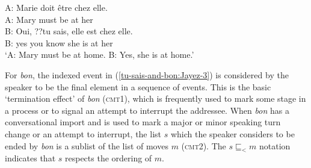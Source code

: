 \documentclass[output=paper,colorlinks,citecolor=brown]{langscibook}
\begin{document}
\ea \label{tu-sais:Jayez}
\gll A: Marie doit être chez elle.\\
A: Mary must be at her\\
\gll B: Oui, ??tu sais, elle est chez elle.\\
B: yes you know she is at her\\
\glt `A: Mary must be at home. B: Yes, she is at home.'
\z

For \textit{bon}, the indexed event in (\ref{tu-sais-and-bon:Jayez-3}) is considered by the speaker to be the final element in a sequence of events. This is the basic `termination effect' of \textit{bon} (\textsc{cmt1}), which is frequently used to mark some stage in a process or to signal an attempt to interrupt the addressee. When \textit{bon} has a conversational import and is used to mark a major or minor speaking turn change or an attempt to interrupt, the list $s$ which the speaker considers to be ended by \textit{bon} is a sublist of the list of moves $m$ (\textsc{cmt2}). The $s \sqsubseteq_{<} m$ notation indicates that $s$ respects the ordering of $m$.

\end{document}
